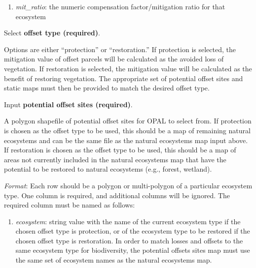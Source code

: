 \documentclass[11pt,letterpaper]{report}
\newenvironment{myenumerate}{%
	\edef\backupindent{\the\parindent}
	\enumerate
	\setlength{\parindent}{\backupindent}
		\setlist[enumerate,1]{label=(\arabic*)}
		\setlist[enumerate,2]{label=(\arabic*)}
}{\endenumerate}
\begin{document}
\begin{myenumerate}
\begin{enumerate}[leftmargin=0.5in,labelindent=!,itemindent=-0.02in]
				\item {\em mit\_{}ratio}: the numeric compensation factor/mitigation ratio for that ecosystem
			
			\end{enumerate}
			
		
		\item Select \textbf{offset type (required)}.
		
			Options are either ``protection'' or ``restoration.'' If protection is selected, the mitigation value of offset parcels will be calculated as the avoided loss of vegetation. If restoration is selected, the mitigation value will be calculated as the benefit of restoring vegetation. The appropriate set of potential offset sites and static maps must then be provided to match the desired offset type.
			
		\item Input \textbf{potential offset sites (required)}.
		
			A polygon shapefile of potential offset sites for OPAL to select from. If protection is chosen as the offset type to be used, this should be a map of remaining natural ecosystems and can be the same file as the natural ecosystems map input above. If restoration is chosen as the offset type to be used, this should be a map of areas not currently included in the natural ecosystems map that have the potential to be restored to natural ecosystems (e.g., forest, wetland). 
			
			\begin{adjustwidth}{0.25in}{}	
				{\em Format}: Each row should be a polygon or multi-polygon of a particular ecosystem type. One column is required, and additional columns will be ignored. The required column must be named as follows:
			\end{adjustwidth}
			
			\begin{enumerate}[leftmargin=0.5in,labelindent=!,itemindent=-0.02in]
				\item	{\em ecosystem}: string value with the name of the current ecosystem type if the chosen offset type is protection, or of the ecosystem type to be restored if the chosen offset type is restoration. In order to match losses and offsets to the same ecosystem type for biodiversity, the potential offsets sites map must use the same set of ecosystem names as the natural ecosystems map.
			\end{enumerate}
						
			
		

\end{myenumerate}
\end{document}
